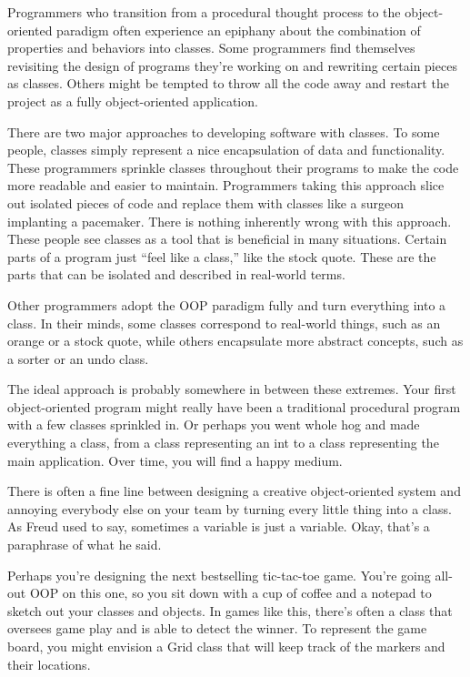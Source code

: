 
Programmers who transition from a procedural thought process to the object-oriented paradigm often experience an epiphany about the combination of properties and behaviors into classes. Some programmers find themselves revisiting the design of programs they’re working on and rewriting certain pieces as classes. Others might be tempted to throw all the code away and restart the project as a fully object-oriented application.

There are two major approaches to developing software with classes. To some people, classes simply represent a nice encapsulation of data and functionality. These programmers sprinkle classes throughout their programs to make the code more readable and easier to maintain. Programmers taking this approach slice out isolated pieces of code and replace them with classes like a surgeon implanting a pacemaker. There is nothing inherently wrong with this approach. These people see classes as a tool that is beneficial in many situations. Certain parts of a program just “feel like a class,” like the stock quote. These are the parts that can be isolated and described in real-world terms.

Other programmers adopt the OOP paradigm fully and turn everything into a class. In their minds, some classes correspond to real-world things, such as an orange or a stock quote, while others encapsulate more abstract concepts, such as a sorter or an undo class.

The ideal approach is probably somewhere in between these extremes. Your first object-oriented program might really have been a traditional procedural program with a few classes sprinkled in. Or perhaps you went whole hog and made everything a class, from a class representing an int to a class representing the main application. Over time, you will find a happy medium.


There is often a fine line between designing a creative object-oriented system and annoying everybody else on your team by turning every little thing into a class. As Freud used to say, sometimes a variable is just a variable. Okay, that’s a paraphrase of what he said.

Perhaps you’re designing the next bestselling tic-tac-toe game. You’re going all-out OOP on this one, so you sit down with a cup of coffee and a notepad to sketch out your classes and objects. In games like this, there’s often a class that oversees game play and is able to detect the winner. To represent the game board, you might envision a Grid class that will keep track of the markers and their locations.

